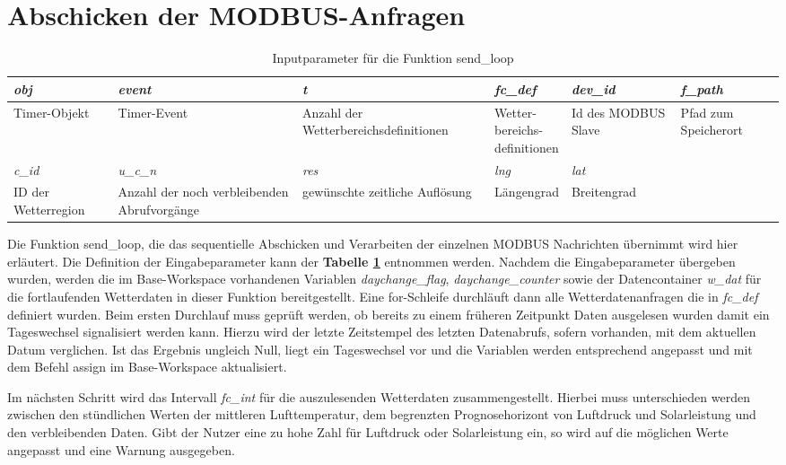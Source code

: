 \section{Abschicken der MODBUS-Anfragen}
\begin{table}[htbp]
\caption{Inputparameter für die Funktion send\_loop}
\setlength{\extrarowheight}{0.1cm}
\begin{tabular}{| p{2cm} | p{3cm} | p{2.5cm} | p{2cm} | p{2cm} | p{2cm} |}
\hline
\rowcolor{cyan}
\textit{obj} & \textit{event} & \textit{t} & \textit{fc\_def} & \textit{dev\_id} &  \textit{f\_path}\\[0.25cm]
\hline
\rowcolor{white}
Timer-Objekt & Timer-Event & Anzahl der Wetterbereichsdefinitionen & \parbox[t]{2cm}{Wetter-\\bereichs-\\definitionen} & Id des MODBUS Slave & Pfad zum Speicherort \\
\hline
{}
\textit{c\_id} & \textit{u\_c\_n} & \textit{res} & \textit{lng} & \textit{lat} & \\[0.25cm]
\hline
{}
ID der Wetterregion & Anzahl der noch verbleibenden Abrufvorgänge & gewünschte zeitliche Auflösung & Längengrad & Breitengrad & \\
\hline
\end{tabular}
\label{tab:parasendloop}
\end{table} 
Die Funktion \textsf{send\_loop}, die das sequentielle Abschicken und Verarbeiten der einzelnen MODBUS Nachrichten übernimmt wird hier erläutert. Die Definition der Eingabeparameter kann der \textbf{Tabelle \ref{tab:parasendloop}} entnommen werden. Nachdem die Eingabeparameter übergeben wurden, werden die im Base-Workspace vorhandenen Variablen \textit{daychange\_flag}, \textit{daychange\_counter}  sowie der Datencontainer \textit{w\_dat} für die fortlaufenden Wetterdaten in dieser Funktion bereitgestellt. Eine for-Schleife durchläuft dann alle Wetterdatenanfragen die in \textit{fc\_def} definiert wurden. Beim ersten Durchlauf muss geprüft werden, ob bereits zu einem früheren Zeitpunkt Daten ausgelesen wurden damit ein Tageswechsel signalisiert werden kann. Hierzu wird der letzte Zeitstempel des letzten Datenabrufs, sofern vorhanden, mit dem aktuellen Datum verglichen. Ist das Ergebnis ungleich Null, liegt ein Tageswechsel vor und die Variablen werden entsprechend angepasst und mit dem Befehl \textsf{assign} im Base-Workspace aktualisiert.

Im nächsten Schritt wird das Intervall \textit{fc\_int} für die auszulesenden Wetterdaten zusammengestellt. Hierbei muss unterschieden werden zwischen den stündlichen Werten der mittleren Lufttemperatur, dem begrenzten Prognosehorizont von Luftdruck und Solarleistung und den verbleibenden Daten. Gibt der Nutzer eine zu hohe Zahl für Luftdruck oder Solarleistung ein, so wird auf die möglichen Werte angepasst und eine Warnung ausgegeben.
